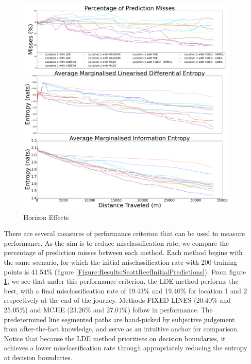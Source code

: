 \documentclass{article}
\begin{document}
		\begin{figure}[!htbp]
		\centering
			\includegraphics[width = \linewidth]{Figures/compare_methods.png}
		\caption{Horizon Effects}
		\label{Figure:Results:CompareMethods}
		\end{figure}
			
		There are several measures of performance criterion that can be used to measure performance. As the aim is to reduce misclassification rate, we compare the percentage of prediction misses between each method. Each method begins with the same scenario, for which the initial misclassification rate with 200 training points is 41.54\% (figure \ref{Figure:Results:ScottReefInitialPredictions}). From figure \ref{Figure:Results:CompareMethods}, we see that under this performance criterion, the LDE method performs the best, with a final misclassification rate of 19.43\% and 19.40\% for location 1 and 2 respectively at the end of the journey. Methods FIXED-LINES (20.40\% and 25.05\%) and MCJIE (23.26\% and 27.01\%) follow in performance. The predetermined line segmented paths are hand-picked by subjective judgement from after-the-fact knowledge, and serve as an intuitive anchor for comparison. Notice that because the LDE method prioritises on decision boundaries, it achieves a lower misclassification rate through appropriately reducing the entropy at decision boundaries.
			
\end{document}
